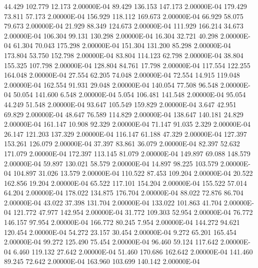     44.429   102.779    12.173  2.00000E-04
    89.429   136.153   147.173  2.00000E-04
   179.429    73.811    57.173  2.00000E-04
   156.929   118.112   169.673  2.00000E-04
    66.929    58.075    79.673  2.00000E-04
    21.929    88.349   124.673  2.00000E-04
   111.929   166.214    34.673  2.00000E-04
   106.304    99.131   130.298  2.00000E-04
    16.304    32.721    40.298  2.00000E-04
    61.304    70.043   175.298  2.00000E-04
   151.304   131.200    85.298  2.00000E-04
   173.804    53.750   152.798  2.00000E-04
    83.804   114.123    62.798  2.00000E-04
    38.804   155.325   107.798  2.00000E-04
   128.804    84.761    17.798  2.00000E-04
   117.554   122.255   164.048  2.00000E-04
    27.554    62.205    74.048  2.00000E-04
    72.554    14.915   119.048  2.00000E-04
   162.554    91.931    29.048  2.00000E-04
   140.054    77.508    96.548  2.00000E-04
    50.054   141.600     6.548  2.00000E-04
     5.054   106.481   141.548  2.00000E-04
    95.054    44.249    51.548  2.00000E-04
    93.647   105.549   159.829  2.00000E-04
     3.647    42.951    69.829  2.00000E-04
    48.647    76.589   114.829  2.00000E-04
   138.647   140.181    24.829  2.00000E-04
   161.147    10.908    92.329  2.00000E-04
    71.147    91.035     2.329  2.00000E-04
    26.147   121.203   137.329  2.00000E-04
   116.147    61.188    47.329  2.00000E-04
   127.397   153.261   126.079  2.00000E-04
    37.397    83.861    36.079  2.00000E-04
    82.397    52.632   171.079  2.00000E-04
   172.397   113.145    81.079  2.00000E-04
   149.897    69.088   148.579  2.00000E-04
    59.897   130.021    58.579  2.00000E-04
    14.897    98.225   103.579  2.00000E-04
   104.897    31.026    13.579  2.00000E-04
   110.522    87.453   109.204  2.00000E-04
    20.522   162.856    19.204  2.00000E-04
    65.522   117.101   154.204  2.00000E-04
   155.522    57.014    64.204  2.00000E-04
   178.022   134.875   176.704  2.00000E-04
    88.022    72.876    86.704  2.00000E-04
    43.022    37.398   131.704  2.00000E-04
   133.022   101.863    41.704  2.00000E-04
   121.772    47.977   142.954  2.00000E-04
    31.772   109.303    52.954  2.00000E-04
    76.772   146.157    97.954  2.00000E-04
   166.772    80.245     7.954  2.00000E-04
   144.272    94.621   120.454  2.00000E-04
    54.272    23.157    30.454  2.00000E-04
     9.272    65.201   165.454  2.00000E-04
    99.272   125.490    75.454  2.00000E-04
    96.460    59.124   117.642  2.00000E-04
     6.460   119.132    27.642  2.00000E-04
    51.460   170.686   162.642  2.00000E-04
   141.460    89.245    72.642  2.00000E-04
   163.960   103.699   140.142  2.00000E-04
